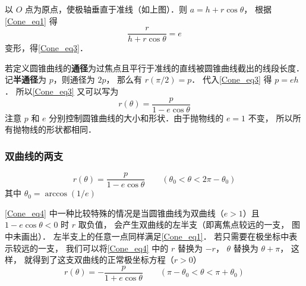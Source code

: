 以 $O$ 点为原点，使极轴垂直于准线（如上图）．则 $a = h + r \cos \theta $， 根据\autoref{Cone_eq1} 得
\begin{equation}\label{Cone_eq2}
\frac{r}{h + r \cos \theta } = e
\end{equation}
变形，得\autoref{Cone_eq3}．


若定义圆锥曲线的\textbf{通径}为过焦点且平行于准线的直线被圆锥曲线截出的线段长度． 记\textbf{半通径}为 $p$，则通径为 $2p$， 那么有 $r(\pi /2) = p$． 代入\autoref{Cone_eq3} 得 $p = eh$． 所以\autoref{Cone_eq3} 又可以写为
\begin{equation}\label{Cone_eq4}
r(\theta)  = \frac{p}{1 - e\cos \theta }
\end{equation}
注意 $p$ 和 $e$ 分别控制圆锥曲线的大小和形状．由于抛物线的 $e = 1$ 不变， 所以所有抛物线的形状都相同．

\subsubsection{双曲线的两支}
\begin{equation}
r(\theta)  = \frac{p}{1 - e\cos \theta } \qquad (\theta_0< \theta < 2\pi-\theta_0)
\end{equation}
其中 $\theta_0 = \arccos(1/e)$

\autoref{Cone_eq4} 中一种比较特殊的情况是当圆锥曲线为双曲线（$e > 1$）且 $1- e\cos\theta < 0$ 时 $r$ 取负值， 会产生双曲线的左半支（即离焦点较远的一支， 图中未画出）． 左半支上的任意一点同样满足\autoref{Cone_eq1}． 若只需要在极坐标中表示较远的一支， 我们可以将\autoref{Cone_eq4} 中的 $r$ 替换为 $-r$， $\theta$ 替换为 $\theta + \pi$， 这样， 就得到了这支双曲线的正常极坐标方程（$r > 0$）
\begin{equation}\label{Cone_eq6}
r(\theta) = -\frac{p}{1 + e\cos\theta} \qquad (\pi - \theta_0<\theta < \pi + \theta_0)
\end{equation}
